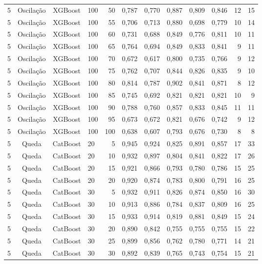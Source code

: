 \begin{longtable}{ccclrrrrrrrr}
5 & Oscilação & XGBoost & 100 & 50 & 0,787 & 0,770 & 0,887 & 0,809 & 0,846 & 12 & 15 \\
5 & Oscilação & XGBoost & 100 & 55 & 0,706 & 0,713 & 0,880 & 0,698 & 0,779 & 10 & 14 \\
5 & Oscilação & XGBoost & 100 & 60 & 0,731 & 0,688 & 0,849 & 0,776 & 0,811 & 10 & 11 \\
5 & Oscilação & XGBoost & 100 & 65 & 0,764 & 0,694 & 0,849 & 0,833 & 0,841 & 9 & 11 \\
5 & Oscilação & XGBoost & 100 & 70 & 0,672 & 0,617 & 0,800 & 0,735 & 0,766 & 9 & 12 \\
5 & Oscilação & XGBoost & 100 & 75 & 0,762 & 0,707 & 0,844 & 0,826 & 0,835 & 9 & 10 \\
5 & Oscilação & XGBoost & 100 & 80 & 0,814 & 0,787 & 0,902 & 0,841 & 0,871 & 8 & 12 \\
5 & Oscilação & XGBoost & 100 & 85 & 0,745 & 0,692 & 0,821 & 0,821 & 0,821 & 10 & 9 \\
5 & Oscilação & XGBoost & 100 & 90 & 0,788 & 0,760 & 0,857 & 0,833 & 0,845 & 11 & 11 \\
5 & Oscilação & XGBoost & 100 & 95 & 0,673 & 0,672 & 0,821 & 0,676 & 0,742 & 9 & 12 \\
5 & Oscilação & XGBoost & 100 & 100 & 0,638 & 0,607 & 0,793 & 0,676 & 0,730 & 8 & 8 \\
5 & Queda & CatBoost & 20 & 5 & 0,945 & 0,924 & 0,825 & 0,891 & 0,857 & 17 & 33 \\
5 & Queda & CatBoost & 20 & 10 & 0,932 & 0,897 & 0,804 & 0,841 & 0,822 & 17 & 26 \\
5 & Queda & CatBoost & 20 & 15 & 0,921 & 0,866 & 0,793 & 0,780 & 0,786 & 15 & 25 \\
5 & Queda & CatBoost & 20 & 20 & 0,920 & 0,874 & 0,783 & 0,800 & 0,791 & 16 & 25 \\
5 & Queda & CatBoost & 30 & 5 & 0,932 & 0,911 & 0,826 & 0,874 & 0,850 & 16 & 30 \\
5 & Queda & CatBoost & 30 & 10 & 0,913 & 0,886 & 0,784 & 0,837 & 0,809 & 16 & 25 \\
5 & Queda & CatBoost & 30 & 15 & 0,933 & 0,914 & 0,819 & 0,881 & 0,849 & 15 & 24 \\
5 & Queda & CatBoost & 30 & 20 & 0,890 & 0,842 & 0,755 & 0,755 & 0,755 & 15 & 22 \\
5 & Queda & CatBoost & 30 & 25 & 0,899 & 0,856 & 0,762 & 0,780 & 0,771 & 14 & 21 \\
5 & Queda & CatBoost & 30 & 30 & 0,892 & 0,839 & 0,765 & 0,743 & 0,754 & 15 & 21 \\

\end{longtable}

